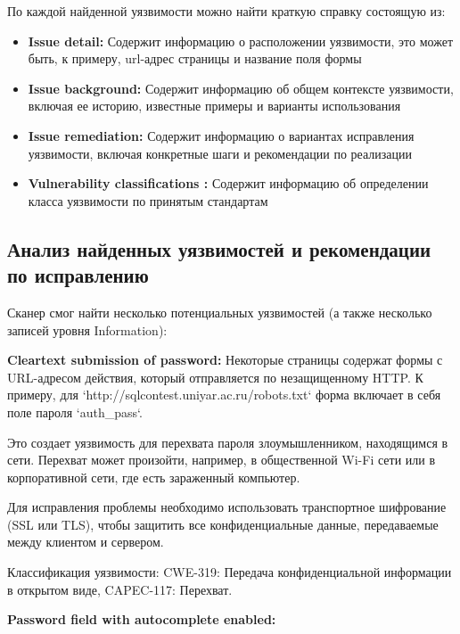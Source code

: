 \documentclass[a4paper,12pt]{diplom}
\begin{document}
	 По каждой найденной уязвимости можно найти краткую справку состоящую из:
	 
	 \begin{itemize}
	 	\item \textbf{Issue detail:} Содержит информацию о расположении уязвимости, это может быть, к примеру, url-адрес страницы и название поля формы
	 	\item \textbf{Issue background:} Содержит информацию об общем контексте уязвимости, включая ее историю, известные примеры и варианты использования
	 	\item \textbf{Issue remediation:} Содержит информацию о вариантах исправления уязвимости, включая конкретные шаги и рекомендации по реализации
	 	\item \textbf{Vulnerability classifications :} Содержит информацию об определении класса уязвимости по принятым стандартам
	 \end{itemize}
	 
	 
	 
	 \subsection{Анализ найденных уязвимостей и рекомендации по исправлению}
	 
	 Сканер смог найти несколько потенциальных уязвимостей (а также несколько записей уровня Information): 
	 
	 
	 
	 
	 \textbf{Cleartext submission of password:}
	 Некоторые страницы содержат формы с URL-адресом действия, который отправляется по незащищенному HTTP. К примеру, для `http://sqlcontest.uniyar.ac.ru/robots.txt` форма включает в себя поле пароля `auth\_pass`. 
	 
	 Это создает уязвимость для перехвата пароля злоумышленником, находящимся в сети. Перехват может произойти, например, в общественной Wi-Fi сети или в корпоративной сети, где есть зараженный компьютер. 
	 
	 Для исправления проблемы необходимо использовать транспортное шифрование (SSL или TLS), чтобы защитить все конфиденциальные данные, передаваемые между клиентом и сервером. 
	 
	 Классификация уязвимости:  CWE-319: Передача конфиденциальной информации в открытом виде, CAPEC-117: Перехват.
	 
	 
	 \medskip\medskip
	 
	 
	 \textbf{Password field with autocomplete enabled:}
	 
\end{document}
